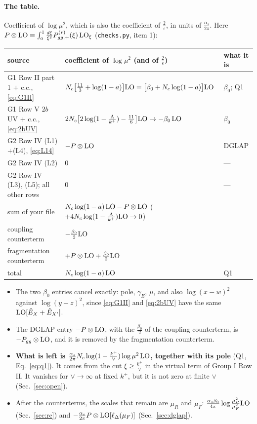 \documentclass[10pt]{article}
\numberwithin{equation}{section}
\newcommand{\LO}{{\rm LO}}
\begin{document}
\paragraph{The table.} Coefficient of $\log\mu^2$, which is also the coefficient of $\frac{2}{\epsilon}$, in units of $\frac{\alpha_s}{2\pi}$. Here $P\otimes\LO\equiv\int_a^1\frac{d\xi}{\xi^2}P^{(r)}_{gg,+}(\xi)\,{\rm LO}_\xi$ (\texttt{checks.py}, item 1):
\begin{center}
\begin{tabular}{@{}lll@{}}\toprule
source & coefficient of $\log\mu^2$ (and of $\frac2\epsilon$) & what it is\\\midrule
G1 Row II part 1 $+$ c.c., \eqref{eq:G1II} & $N_c\big[\frac{11}{3}+\log(1-a)\big]\LO=\big[\beta_0+N_c\log(1-a)\big]\LO$ & $\beta_0$; Q1\\
G1 Row V $2b$ UV $+$ c.c., \eqref{eq:2bUV} & $2N_c\big[2\log(1-\frac{\Lambda}{k^+})-\frac{11}{6}\big]\LO\to-\beta_0\,\LO$ & $\beta_0$\\
G2 Row IV (L1)$+$(L4), \eqref{eq:L14} & $-P\otimes\LO$ & DGLAP\\
G2 Row IV (L2) & $0$ & ---\\
G2 Row IV (L3), (L5); all other rows & $0$ & ---\\\midrule
sum of your file & $N_c\log(1-a)\,\LO-P\otimes\LO$ \;\;($+4N_c\log(1-\frac{\Lambda}{k^+})\LO\to0$) & \\\midrule
coupling counterterm & $-\frac{\beta_0}{2}\LO$ & \\
fragmentation counterterm & $+P\otimes\LO+\frac{\beta_0}{2}\LO$ & \\\midrule
total & $N_c\log(1-a)\,\LO$ & Q1\\\bottomrule
\end{tabular}
\end{center}
\begin{itemize}
\item The two $\beta_0$ entries cancel exactly: pole, $\gamma_E$, $\mu$, and also $\log(x-w)^2$ against $\log(y-z)^2$, since \eqref{eq:G1II} and \eqref{eq:2bUV} have the same $\LO[\hat E_X+\hat E_{X'}]$.
\item The DGLAP entry $-P\otimes\LO$, with the $\frac{\beta_0}{2}$ of the coupling counterterm, is $-P_{gg}\otimes\LO$, and it is removed by the fragmentation counterterm.
\item \textbf{What is left is $\frac{\alpha_s}{2\pi}N_c\log(1-\frac{k^+}{\vee})\log\mu^2\,\LO$, together with its pole} (Q1, Eq.~\eqref{eq:q1}). It comes from the cut $\xi\ge\frac{k^+}{\vee}$ in the virtual term of Group I Row II. It vanishes for $\vee\to\infty$ at fixed $k^+$, but it is not zero at finite $\vee$ (Sec.~\ref{sec:open}).
\item After the counterterms, the scales that remain are $\mu_R$ and $\mu_F$: $\frac{\alpha_s\beta_0}{4\pi}\log\frac{\mu_R^2}{\mu_F^2}\LO$ (Sec.~\ref{sec:rc}) and $-\frac{\alpha_s}{2\pi}P\otimes\LO[\ell_\Delta(\mu_F)]$ (Sec.~\ref{sec:dglap}).
\end{itemize}
\end{document}
